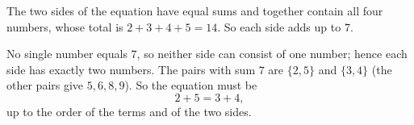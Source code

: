 The two sides of the equation have equal sums and together contain all four numbers, whose total is $2+3+4+5=14$. So each side adds up to $7$.

No single number equals $7$, so neither side can consist of one number; hence each side has exactly two numbers. The pairs with sum $7$ are $\{2,5\}$ and $\{3,4\}$ (the other pairs give $5,6,8,9$). So the equation must be
\[\boxed{2+5=3+4},\]
up to the order of the terms and of the two sides.
